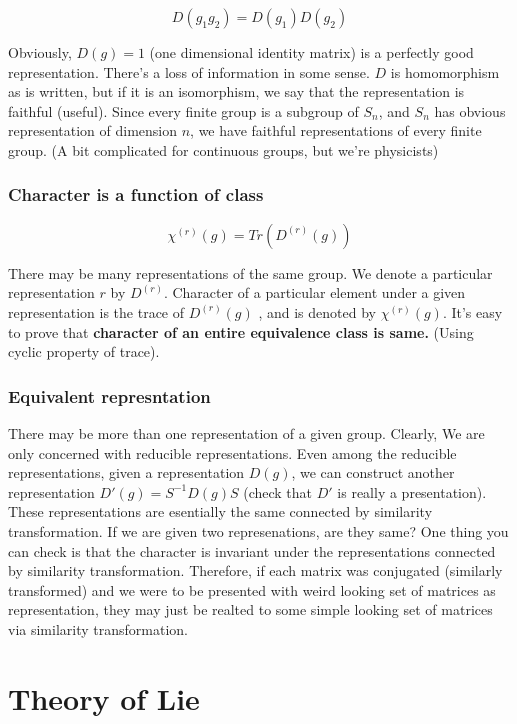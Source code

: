 \documentclass{report}
\begin{document}
$$D(g_1 g_2) = D(g_1)D(g_2)$$

\noindent Obviously, $D(g) = 1$ (one dimensional identity matrix) is a perfectly good representation. There's a loss of information in some sense. $D$ is homomorphism as is written, but if it is an isomorphism, we say that the representation is faithful (useful). Since every finite group is a subgroup of $S_n$, and $S_n$ has obvious representation of dimension $n$, we have faithful representations of every finite group. (A bit complicated for continuous groups, but we're physicists)

\subsection{Character is a function of class}

$$\chi^{(r)}(g) = Tr(D^{(r)}(g))$$

\noindent There may be many representations of the same group. We denote a particular representation $r$ by $D^{(r)}$. Character of a particular element under a given representation is the trace of $D^{(r)}(g)$ , and is denoted by $\chi^{(r)}(g)$. It's easy to prove that \textbf{character of an entire equivalence class is same.} (Using cyclic property of trace).

\subsection{Equivalent represntation} 

There may be more than one representation of a given group. Clearly, We are only concerned with reducible representations. Even among the reducible representations, given a representation $D(g)$, we can construct another representation $D'(g) = S^{-1} D(g) S$ (check that $D'$ is really a presentation). These representations are esentially the same connected by similarity transformation. If we are given two represenations, are they same? One thing you can check is that the character is invariant under the representations connected by similarity transformation. Therefore, if each matrix was conjugated (similarly transformed) and we were to be presented with weird looking set of matrices as representation, they may just be realted to some simple looking set of matrices via similarity transformation.

\chapter{Theory of Lie}
\end{document}
